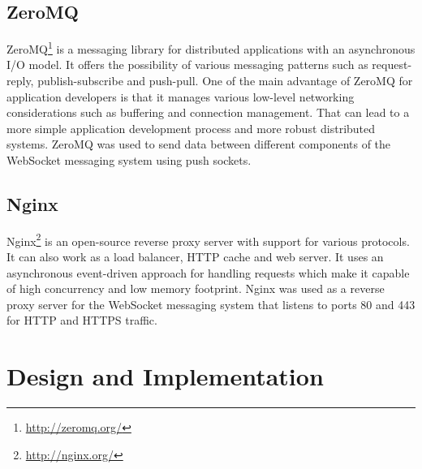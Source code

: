\subsection{ZeroMQ}

ZeroMQ\footnote{\url{http://zeromq.org/}} is a messaging library for distributed applications with an asynchronous I/O model. It offers the possibility of various messaging patterns such as request-reply, publish-subscribe and push-pull. One of the main advantage of ZeroMQ for application developers is that it manages various low-level networking considerations such as buffering and connection management. That can lead to a more simple application development process and more robust distributed systems. ZeroMQ was used to send data between different components of the WebSocket messaging system using push sockets.

\subsection{Nginx}

Nginx\footnote{\url{http://nginx.org/}} is an open-source reverse proxy server with support for various protocols. It can also work as a load balancer, HTTP cache and web server. It uses an asynchronous event-driven approach for handling requests which make it capable of high concurrency and low memory footprint. Nginx was used as a reverse proxy server for the WebSocket messaging system that listens to ports 80 and 443 for HTTP and HTTPS traffic.

\section{Design and Implementation}


